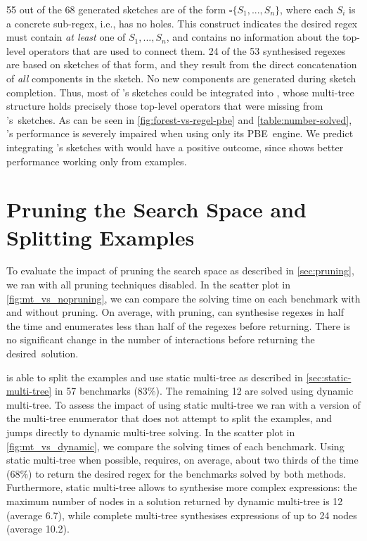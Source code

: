 55 out of the 68 generated sketches are of the form \(\square\{S_1, ..., S_n\}\),
where each \(S_i\) is a concrete sub-regex, i.e., has no holes.
This construct indicates the desired regex must contain \textit{at least} one of \(S_1, ..., S_n\),
and contains no information about the top-level operators that are used to connect them.
%
24 of the 53 synthesised regexes are based on sketches of that form, and they result from the direct concatenation of \textit{all} components in the sketch. No new components are generated during sketch completion.
%
Thus, most of \Regel{}'s sketches could be integrated into \Forest{}, whose multi-tree structure holds precisely those top-level operators that were missing from \Regel's~sketches. As can be seen in \autoref{fig:forest-vs-regel-pbe} and \autoref{table:number-solved}, \Regel's performance is severely impaired when using only its PBE~engine. We predict integrating \Regel{}'s sketches with \Forest would have a positive outcome, since \Forest shows better performance working only from examples.

\section{Pruning the Search Space and Splitting Examples}\label{sec:pruning-split}



To evaluate the impact of pruning the search space as described in \autoref{sec:pruning}, we ran \Forest{} with all pruning techniques disabled.
In the scatter plot in \autoref{fig:mt_vs_nopruning}, we can compare the solving time on each benchmark with and without pruning.
On average, with pruning, \Forest{} can synthesise regexes in half the time and enumerates less than half of the regexes before returning. There is no significant change in the number of interactions before returning the desired~solution.

\Forest{} is able to split the examples and use static multi-tree as described in \autoref{sec:static-multi-tree} in 57 benchmarks (83\%).
The remaining 12 are solved using dynamic multi-tree.
To assess the impact of using static multi-tree we ran \Forest{} with a version of the multi-tree enumerator that does not attempt to split the examples, and jumps directly to dynamic multi-tree solving.
In the scatter plot in \autoref{fig:mt_vs_dynamic}, we compare the solving times of each benchmark.
Using static multi-tree when possible, \Forest{} requires, on average, about two thirds of the time (68\%) to return the desired regex for the benchmarks solved by both methods.
Furthermore, static multi-tree allows \Forest{} to synthesise more complex expressions: the maximum number of nodes in a solution returned by dynamic multi-tree is 12 (average 6.7), while complete multi-tree synthesises expressions of up to 24 nodes (average 10.2).



